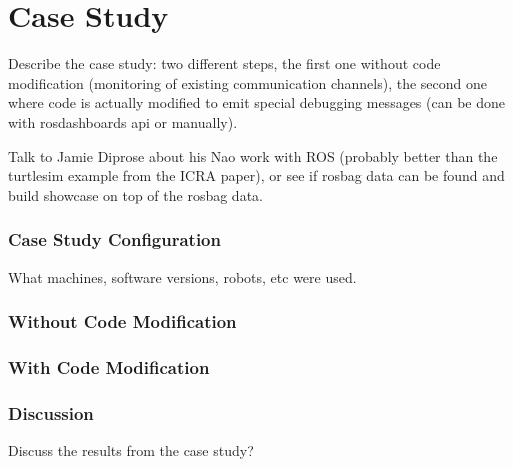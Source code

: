 \chapter{Case Study}
Describe the case study: two different steps, the first one without code modification (monitoring of existing communication channels), the second one where code is actually modified to emit special debugging messages (can be done with rosdashboards api or manually).

Talk to Jamie Diprose about his Nao work with ROS (probably better than the turtlesim example from the ICRA paper), or see if rosbag data can be found and build showcase on top of the rosbag data.

\subsection{Case Study Configuration}
What machines, software versions, robots, etc were used.

\subsection{Without Code Modification}
\subsection{With Code Modification}

\subsection{Discussion}
Discuss the results from the case study?

